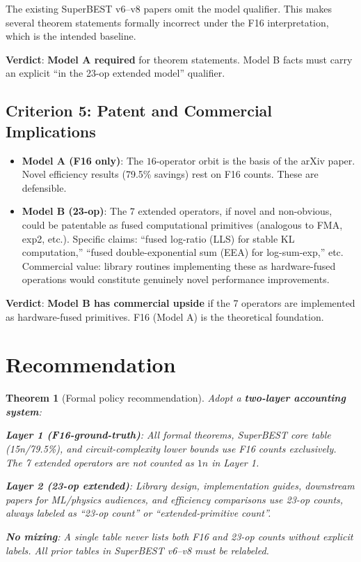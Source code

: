 \documentclass[11pt]{article}
\newtheorem{theorem}{Theorem}
\begin{document}
The existing SuperBEST v6--v8 papers omit the model qualifier.
This makes several theorem statements formally incorrect under the F16 interpretation,
which is the intended baseline.

\textbf{Verdict}: \textbf{Model A required} for theorem statements.
Model B facts must carry an explicit ``in the 23-op extended model'' qualifier.

\subsection{Criterion 5: Patent and Commercial Implications}

\begin{itemize}
  \item \textbf{Model A (F16 only)}: The $16$-operator orbit is the basis of the arXiv paper.
    Novel efficiency results (79.5\% savings) rest on F16 counts. These are defensible.
  \item \textbf{Model B (23-op)}: The $7$ extended operators, if novel and non-obvious,
    could be patentable as fused computational primitives (analogous to FMA, exp2, etc.).
    Specific claims: ``fused log-ratio (LLS) for stable KL computation,''
    ``fused double-exponential sum (EEA) for log-sum-exp,'' etc.
    Commercial value: library routines implementing these as hardware-fused operations
    would constitute genuinely novel performance improvements.
\end{itemize}

\textbf{Verdict}: \textbf{Model B has commercial upside} if the 7 operators are
implemented as hardware-fused primitives. F16 (Model A) is the theoretical foundation.

\section{Recommendation}

\begin{theorem}[Formal policy recommendation]
\label{thm:policy}
Adopt a \textbf{two-layer accounting system}:

\textbf{Layer 1 (F16-ground-truth)}: All formal theorems, SuperBEST core table (15n/79.5\%),
and circuit-complexity lower bounds use F16 counts exclusively.
The 7 extended operators are \emph{not} counted as $1n$ in Layer 1.

\textbf{Layer 2 (23-op extended)}: Library design, implementation guides, downstream papers
for ML/physics audiences, and efficiency comparisons use 23-op counts,
\emph{always labeled as ``23-op count'' or ``extended-primitive count''}.

\textbf{No mixing}: A single table never lists both F16 and 23-op counts without explicit labels.
All prior tables in SuperBEST v6--v8 must be relabeled.
\end{theorem}
\end{document}
